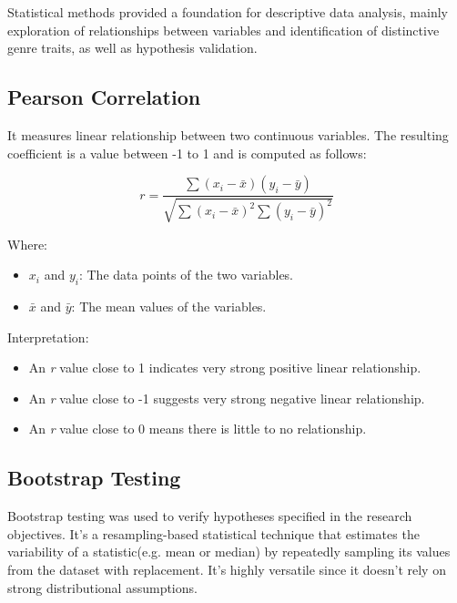 Statistical methods provided a foundation for descriptive data analysis, mainly
exploration of relationships between variables and identification of distinctive
genre traits, as well as hypothesis validation.

\subsection{Pearson Correlation}

It measures linear relationship between two continuous variables. The resulting
coefficient is a value between -1 to 1 and is computed as follows: 

\[
r = \frac{\sum{(x_i - \bar{x})(y_i - \bar{y})}}{\sqrt{\sum{(x_i - \bar{x})^2} \sum{(y_i - \bar{y})^2}}}
\]

\noindent \noindent Where:
\begin{itemize}
    \item \( x_i \) and \( y_i \): The data points of the two variables.
    \item \( \bar{x} \) and \( \bar{y} \): The mean values of the variables.
\end{itemize}

\noindent \noindent Interpretation:
\begin{itemize}
  \item An \textit{r} value close to 1 indicates very strong positive linear
    relationship.
  \item An \textit{r} value close to -1 suggests very strong negative linear
    relationship.
  \item An \textit{r} value close to 0 means there is little to no relationship.
\end{itemize}



\subsection{Bootstrap Testing}

Bootstrap testing was used to verify hypotheses specified in the research
objectives. It's a resampling-based statistical technique that estimates the
variability of a statistic(e.g. mean or median)  by repeatedly sampling its
values from the dataset with replacement. It's highly versatile since it
doesn't rely on strong distributional assumptions.



